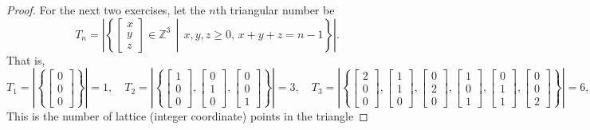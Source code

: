 \documentclass[12pt]{article}
\theoremstyle{plain}
\begin{document}
\begin{proof}
  For the next two exercises, let the $n$th triangular number be
  \[
    T_n=\left|\left\{\begin{bmatrix}x\\y\\z\end{bmatrix}\in\mathbb{Z}^3\,\middle|\,x,y,z\geq0,\,x+y+z=n-1\right\}\right|.
  \]
  That is,
  \[
    T_1=\left|\left\{\begin{bmatrix}0\\0\\0\end{bmatrix}\right\}\right|=1,\quad
    T_2=\left|\left\{\begin{bmatrix}1\\0\\0\end{bmatrix},\begin{bmatrix}0\\1\\0\end{bmatrix},\begin{bmatrix}0\\0\\1\end{bmatrix}\right\}\right|=3,\quad
    T_3=\left|\left\{\begin{bmatrix}2\\0\\0\end{bmatrix},\begin{bmatrix}1\\1\\0\end{bmatrix},\begin{bmatrix}0\\2\\0\end{bmatrix},\begin{bmatrix}1\\0\\1\end{bmatrix},\begin{bmatrix}0\\1\\1\end{bmatrix},\begin{bmatrix}0\\0\\2\end{bmatrix}\right\}\right|=6,\ldots
  \]
  This is the number of lattice (integer coordinate) points in the triangle

\end{proof}
\end{document}
